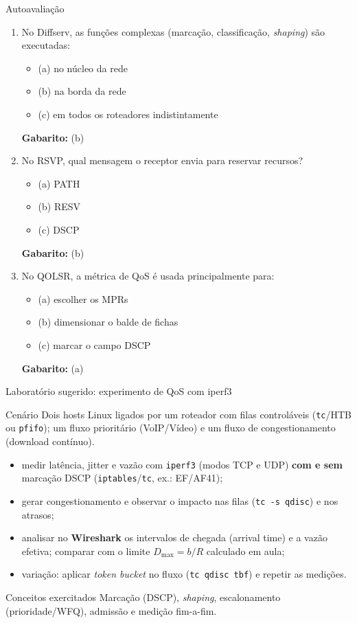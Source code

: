 \documentclass[aspectratio=169,11pt]{beamer}
\begin{document}
\begin{frame}{Autoavaliação}
  \small
  \begin{enumerate}
    \item No Diffserv, as funções complexas (marcação, classificação, \emph{shaping}) são executadas:
      \begin{itemize}
        \item (a) no núcleo da rede
        \item (b) na borda da rede
        \item (c) em todos os roteadores indistintamente
      \end{itemize}
      \pause
      \textbf{Gabarito:} (b)
    \item No RSVP, qual mensagem o receptor envia para reservar recursos?
      \begin{itemize}
        \item (a) PATH
        \item (b) RESV
        \item (c) DSCP
      \end{itemize}
      \pause
      \textbf{Gabarito:} (b)
    \item No QOLSR, a métrica de QoS é usada principalmente para:
      \begin{itemize}
        \item (a) escolher os MPRs
        \item (b) dimensionar o balde de fichas
        \item (c) marcar o campo DSCP
      \end{itemize}
      \pause
      \textbf{Gabarito:} (a)
  \end{enumerate}
\end{frame}

\begin{frame}{Laboratório sugerido: experimento de QoS com iperf3}
  \begin{block}{Cenário}
    Dois hosts Linux ligados por um roteador com filas controláveis (\texttt{tc}/HTB ou \texttt{pfifo}); um fluxo prioritário (VoIP/Vídeo) e um fluxo de congestionamento (download contínuo).
  \end{block}
  \begin{itemize}
    \item medir latência, jitter e vazão com \texttt{iperf3} (modos TCP e UDP) \textbf{com e sem} marcação DSCP (\texttt{iptables}/\texttt{tc}, ex.: EF/AF41);
    \item gerar congestionamento e observar o impacto nas filas (\texttt{tc -s qdisc}) e nos atrasos;
    \item analisar no \textbf{Wireshark} os intervalos de chegada (arrival time) e a vazão efetiva; comparar com o limite $D_{\max}=b/R$ calculado em aula;
    \item variação: aplicar \emph{token bucket} no fluxo (\texttt{tc qdisc tbf}) e repetir as medições.
  \end{itemize}
  \begin{alertblock}{Conceitos exercitados}
    Marcação (DSCP), \emph{shaping}, escalonamento (prioridade/WFQ), admissão e medição fim-a-fim.
  \end{alertblock}
\end{frame}
\end{document}
